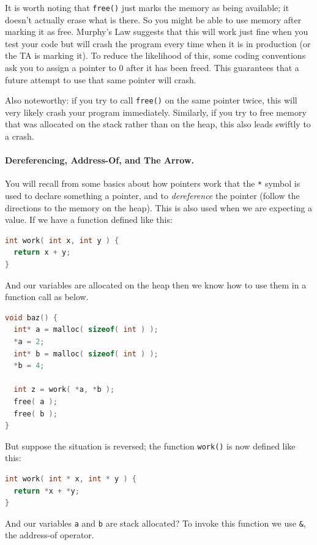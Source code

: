 \documentclass[a4paper]{report}
\begin{document}
It is worth noting that \texttt{free()} just marks the memory as being available; it doesn't actually erase what is there. So you might be able to use memory after marking it as free. Murphy's Law suggests that this will work just fine when you test your code but will crash the program every time when it is in production (or the TA is marking it). To reduce the likelihood of this, some coding conventions ask you to assign a pointer to 0 after it has been freed. This guarantees that a future attempt to use that same pointer will crash.

Also noteworthy: if you try to call \texttt{free()} on the same pointer twice, this will very likely crash your program immediately. Similarly, if you try to free memory that was allocated on the stack rather than on the heap, this also leads swiftly to a crash.

\paragraph{Dereferencing, Address-Of, and The Arrow.}
You will recall from some basics about how pointers work that the \texttt{*} symbol is used to declare something a pointer, and to \textit{dereference} the pointer (follow the directions to the memory on the heap). This is also used when we are expecting a value. If we have a function defined like this:

\begin{lstlisting}[language=C]
int work( int x, int y ) {
  return x + y;
}
\end{lstlisting}

And our variables are allocated on the heap then we know how to use them in a function call as below.

\begin{lstlisting}[language=C]
void baz() {
  int* a = malloc( sizeof( int ) );
  *a = 2;
  int* b = malloc( sizeof( int ) );
  *b = 4;
  
  int z = work( *a, *b );
  free( a );
  free( b );
}
\end{lstlisting}

But suppose the situation is reversed; the function \texttt{work()} is now defined like this:

\begin{lstlisting}[language=C]
int work( int * x, int * y ) {
  return *x + *y;
}
\end{lstlisting}

And our variables \texttt{a} and \texttt{b} are stack allocated? To invoke this function we use \texttt{\&}, the address-of operator.
\end{document}

